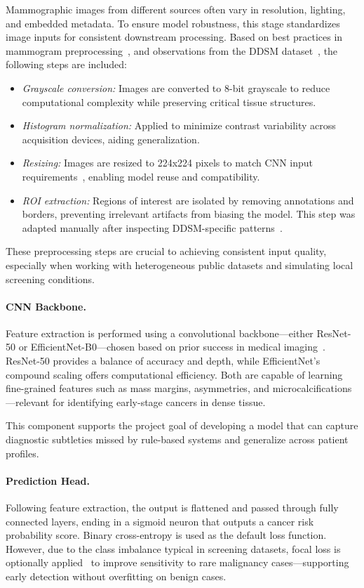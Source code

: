 \documentclass[12pt]{article}
\begin{document}
Mammographic images from different sources often vary in resolution, lighting, and embedded metadata. To ensure model robustness, this stage standardizes image inputs for consistent downstream processing. Based on best practices in mammogram preprocessing~\cite{7,14}, and observations from the DDSM dataset~\cite{17}, the following steps are included:

\begin{itemize}
    \item \textit{Grayscale conversion:} Images are converted to 8-bit grayscale to reduce computational complexity while preserving critical tissue structures.
    \item \textit{Histogram normalization:} Applied to minimize contrast variability across acquisition devices, aiding generalization.
    \item \textit{Resizing:} Images are resized to 224x224 pixels to match CNN input requirements~\cite{1}, enabling model reuse and compatibility.
    \item \textit{ROI extraction:} Regions of interest are isolated by removing annotations and borders, preventing irrelevant artifacts from biasing the model. This step was adapted manually after inspecting DDSM-specific patterns~\cite{17}.
\end{itemize}

These preprocessing steps are crucial to achieving consistent input quality, especially when working with heterogeneous public datasets and simulating local screening conditions.

\paragraph{CNN Backbone.}
Feature extraction is performed using a convolutional backbone—either ResNet-50 or EfficientNet-B0—chosen based on prior success in medical imaging~\cite{1,7}. ResNet-50 provides a balance of accuracy and depth, while EfficientNet’s compound scaling offers computational efficiency. Both are capable of learning fine-grained features such as mass margins, asymmetries, and microcalcifications—relevant for identifying early-stage cancers in dense tissue.

This component supports the project goal of developing a model that can capture diagnostic subtleties missed by rule-based systems and generalize across patient profiles.

\paragraph{Prediction Head.}
Following feature extraction, the output is flattened and passed through fully connected layers, ending in a sigmoid neuron that outputs a cancer risk probability score. Binary cross-entropy is used as the default loss function. However, due to the class imbalance typical in screening datasets, focal loss is optionally applied~\cite{2} to improve sensitivity to rare malignancy cases—supporting early detection without overfitting on benign cases.
\end{document}
